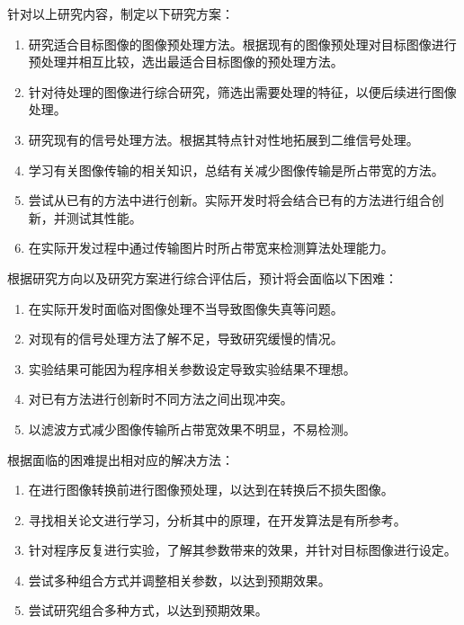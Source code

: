 针对以上研究内容，制定以下研究方案：
\begin{enumerate}[label=\arabic*)]
    \item 研究适合目标图像的图像预处理方法。根据现有的图像预处理对目标图像进行预处理并相互比较，选出最适合目标图像的预处理方法。
    \item 针对待处理的图像进行综合研究，筛选出需要处理的特征，以便后续进行图像处理。
    \item 研究现有的信号处理方法。根据其特点针对性地拓展到二维信号处理。
    \item 学习有关图像传输的相关知识，总结有关减少图像传输是所占带宽的方法。
    \item 尝试从已有的方法中进行创新。实际开发时将会结合已有的方法进行组合创新，并测试其性能。
    \item 在实际开发过程中通过传输图片时所占带宽来检测算法处理能力。
\end{enumerate}


根据研究方向以及研究方案进行综合评估后，预计将会面临以下困难：
\begin{enumerate}[label=\arabic*)]
    \item 在实际开发时面临对图像处理不当导致图像失真等问题。
    \item 对现有的信号处理方法了解不足，导致研究缓慢的情况。
    \item 实验结果可能因为程序相关参数设定导致实验结果不理想。
    \item 对已有方法进行创新时不同方法之间出现冲突。
    \item 以滤波方式减少图像传输所占带宽效果不明显，不易检测。
\end{enumerate}

根据面临的困难提出相对应的解决方法：
\begin{enumerate}[label=\arabic*)]
    \item 在进行图像转换前进行图像预处理，以达到在转换后不损失图像。
    \item 寻找相关论文进行学习，分析其中的原理，在开发算法是有所参考。
    \item 针对程序反复进行实验，了解其参数带来的效果，并针对目标图像进行设定。
    \item 尝试多种组合方式并调整相关参数，以达到预期效果。
    \item 尝试研究组合多种方式，以达到预期效果。
\end{enumerate}